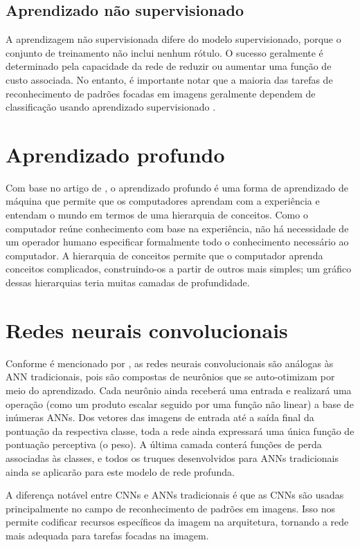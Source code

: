 \documentclass[
	12pt,				%
	oneside,			%
	a4paper,			%
	english,			%
	brazil				%
	]{abntex2ppgsi}
\begin{document}
\subsection{Aprendizado não supervisionado}
A aprendizagem não supervisionada difere do modelo supervisionado, porque o conjunto de treinamento não inclui nenhum rótulo. O sucesso geralmente é determinado pela capacidade da rede de reduzir ou aumentar uma função de custo associada. No entanto, é importante notar que a maioria das tarefas de reconhecimento de padrões focadas em imagens geralmente dependem de classificação usando aprendizado supervisionado \cite{o2015introduction}.

\section{Aprendizado profundo}

Com base no artigo de , o aprendizado profundo é uma forma de aprendizado de máquina que permite que os computadores aprendam com a experiência e entendam o mundo em termos de uma hierarquia de conceitos. Como o computador reúne conhecimento com base na experiência, não há necessidade de um operador humano especificar formalmente todo o conhecimento necessário ao computador. A hierarquia de conceitos permite que o computador aprenda conceitos complicados, construindo-os a partir de outros mais simples; um gráfico dessas hierarquias teria muitas camadas de profundidade.

\section{Redes neurais convolucionais}

Conforme é mencionado por , as redes neurais convolucionais são análogas às ANN tradicionais, pois são compostas de neurônios que se auto-otimizam por meio do aprendizado. Cada neurônio ainda receberá uma entrada e realizará uma operação (como um produto escalar seguido por uma função não linear) a base de inúmeras ANNs. Dos vetores das imagens de entrada até a saída final da pontuação da respectiva classe, toda a rede ainda expressará uma única função de pontuação perceptiva (o peso). A última camada conterá funções de perda associadas às classes, e todos os truques desenvolvidos para ANNs tradicionais ainda se aplicarão para este modelo de rede profunda.

A diferença notável entre CNNs e ANNs tradicionais é que as CNNs são usadas principalmente no campo de reconhecimento de padrões em imagens. Isso nos permite codificar recursos específicos da imagem na arquitetura, tornando a rede mais adequada para tarefas focadas na imagem.
\end{document}
